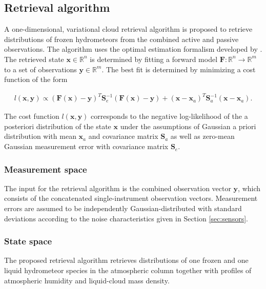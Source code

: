 \documentclass[journal abbreviation, manuscript]{copernicus}
\begin{document}
\subsection{Retrieval algorithm}
\label{sec:orgb528563}

A one-dimensional, variational cloud retrieval algorithm is proposed to
retrieve distributions of frozen hydrometeors from the combined active and
passive observations. The algorithm uses the optimal estimation formalism
developed by \cite{rodgers00}. The retrieved state $\mathbf{x} \in
   \mathbb{R}^n$ is determined by fitting a forward model $\mathbf{F} : \mathbb{R}^n
   \rightarrow \mathbb{R}^m$ to a set of observations $\mathbf{y} \in
   \mathbb{R}^m$. The best fit is determined by minimizing a cost function of
the form

\begin{align}
l(\mathbf{x}, \mathbf{y}) \propto
 \left(\mathbf{F}(\mathbf{x}) - \mathbf{y} \right )^T
  \mathbf{S}_e^{-1} 
  \left ( \mathbf{F}(\mathbf{x}) - \mathbf{y} \right)
+ \left ( \mathbf{x} - \mathbf{x}_a \right )^T
 \mathbf{S}^{-1}_a 
 \left ( \mathbf{x} - \mathbf{x}_a \right ).
\end{align}

The cost function $l(\mathbf{x}, \mathbf{y})$ corresponds to the negative
log-likelihood of the a posteriori distribution of the state $\mathbf{x}$
under the assumptions of Gaussian a priori distribution with mean
$\mathbf{x}_a$ and covariance matrix $\mathbf{S}_a$ as well as zero-mean Gaussian
measurement error with covariance
matrix $\mathbf{S}_e$.

\subsubsection{Measurement space}
\label{sec:orge7dc286}

The input for the retrieval algorithm is the combined observation vector
$\mathbf{y}$, which consists of the concatenated single-instrument observation
vectors. Measurement errors are assumed to be independently Gaussian-distributed
with standard deviations according to the noise characteristics given in Section
\ref{sec:sensors}. 

\subsubsection{State space}
\label{sec:orgae5ee4e}

The proposed retrieval algorithm retrieves distributions of one frozen
and one liquid hydrometeor species in the atmospheric column together with
profiles of atmospheric humidity and liquid-cloud mass density.
\end{document}

